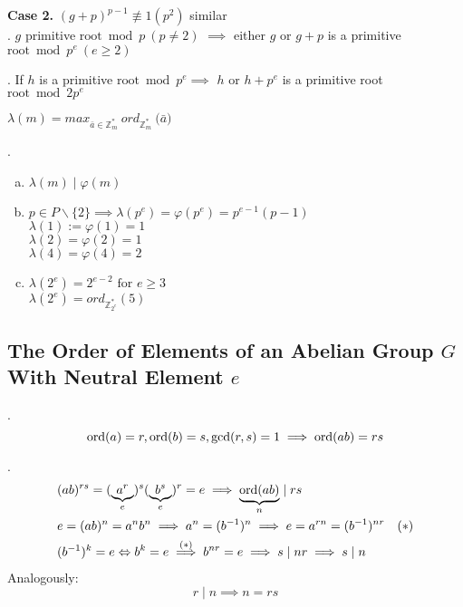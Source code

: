 \textbf{Case 2.} $(g+p)^{p-1} \not\equiv 1 (p^2)$ similar\\

\Lemma.
$g$ primitive $\text{root}\bmod{p} ~ (p \neq 2)$ $\implies$ either $g$ or $g+p$ is a primitive $\text{root}\bmod{p^e} ~ (e \geq 2)$

\Lemma.
If $h$ is a primitive $\text{root} \bmod{p^e} \implies$ $h$ or $h+p^e$ is a primitive root $\text{root} \bmod{2p^e}$

\begin{definition}
  $\lambda(m) = max_{\bar{a} \in \mathbb{Z}_m^{*}} ~ord_{\mathbb{Z}_m^{*}}\pod{\bar{a}}$
\end{definition}

\Remark.
\begin{enumerate}[a)]

  \item $\lambda(m) \mid \varphi(m)$

  \item $p \in P \backslash\{2\} \implies \lambda(p^e) = \varphi(p^e) = p^{e-1}(p-1)$ \\
  $\lambda(1) := \varphi(1) = 1$\\
  $\lambda(2) = \varphi(2) = 1$\\
  $\lambda(4) = \varphi(4) = 2$

  \item $\lambda(2^e) = 2^{e-2} \text{ for } e \geq 3$ \\
  $\lambda(2^e) = ord_{\mathbb{Z}_{2^e}^{*}}(5)$

\end{enumerate}

\subsection{The Order of Elements of an Abelian Group $G$ With Neutral Element $e$}
\Theorem.
\[
  \operatorname{ord}(a) = r, \operatorname{ord}(b) = s, \gcd(r,s) = 1 \implies \operatorname{ord}(ab) = rs
\]

\Proof.
\begin{align*}
  &(ab)^{rs} = (\underbrace{a^r}_{e})^s (\underbrace{b^s}_{e})^r = e \implies \underbrace{\operatorname{ord}(ab)}_{n} \mid rs \\
  &e = (ab)^n = a^n b^n \implies a^n = (b^{-1})^n \implies e = a^{rn} = (b^{-1})^{nr} \quad (*)\\
  &(b^{-1})^k = e \Leftrightarrow b^k = e \stackrel{(*)}{\implies} b^{nr} = e \implies s \mid nr \implies s \mid n \\
\end{align*}
Analogously:
\[
  r \mid n \implies n = rs
\]

